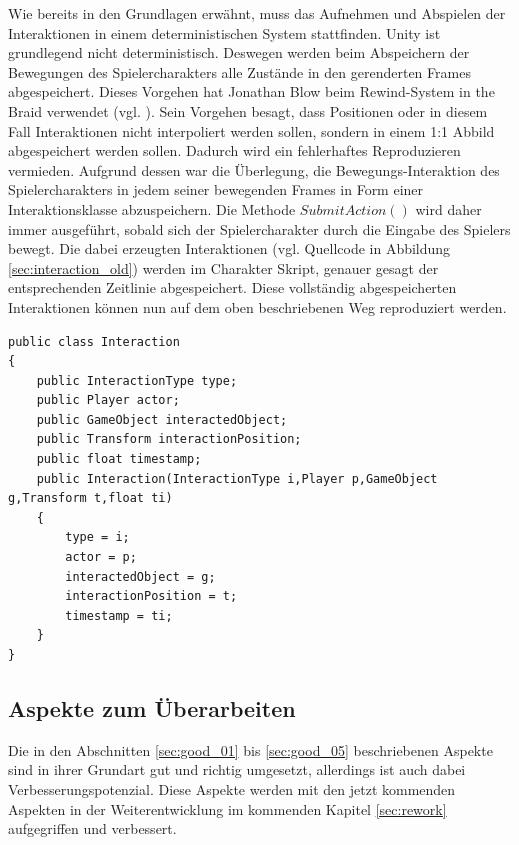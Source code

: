Wie bereits in den Grundlagen erwähnt, muss das Aufnehmen und Abspielen der Interaktionen in einem deterministischen System stattfinden. Unity ist grundlegend nicht deterministisch. Deswegen werden beim Abspeichern der Bewegungen des Spielercharakters alle Zustände in den gerenderten Frames abgespeichert. Dieses Vorgehen hat Jonathan Blow beim Rewind-System in the Braid verwendet (vgl. \cite{gdc_implementation_2016}). Sein Vorgehen besagt, dass Positionen oder in diesem Fall Interaktionen nicht interpoliert werden sollen, sondern in einem 1:1 Abbild abgespeichert werden sollen. Dadurch wird ein fehlerhaftes Reproduzieren vermieden. Aufgrund dessen war die Überlegung, die Bewegungs-Interaktion des Spielercharakters in jedem seiner bewegenden Frames in Form einer Interaktionsklasse abzuspeichern. Die Methode $SubmitAction()$ wird daher immer ausgeführt, sobald sich der Spielercharakter durch die Eingabe des Spielers bewegt. Die dabei erzeugten Interaktionen (vgl. Quellcode in Abbildung \ref{sec:interaction_old}) werden im Charakter Skript, genauer gesagt der entsprechenden Zeitlinie abgespeichert. Diese vollständig abgespeicherten Interaktionen können nun auf dem oben beschriebenen Weg reproduziert werden.

\begin{lstlisting}[caption={Interaktionsklasse}, label={sec:interaction_old}]
public class Interaction
{
    public InteractionType type;
    public Player actor;
    public GameObject interactedObject;
    public Transform interactionPosition;
    public float timestamp;
    public Interaction(InteractionType i,Player p,GameObject g,Transform t,float ti)
    {
        type = i;
        actor = p;
        interactedObject = g;
        interactionPosition = t;
        timestamp = ti;
    }
}

\end{lstlisting}

\subsection{Aspekte zum Überarbeiten}
Die in den Abschnitten \ref{sec:good_01} bis \ref{sec:good_05} beschriebenen Aspekte sind in ihrer Grundart gut und richtig umgesetzt, allerdings ist auch dabei Verbesserungspotenzial. Diese Aspekte werden mit den jetzt kommenden Aspekten in der Weiterentwicklung im kommenden Kapitel \ref{sec:rework}  aufgegriffen und verbessert.
